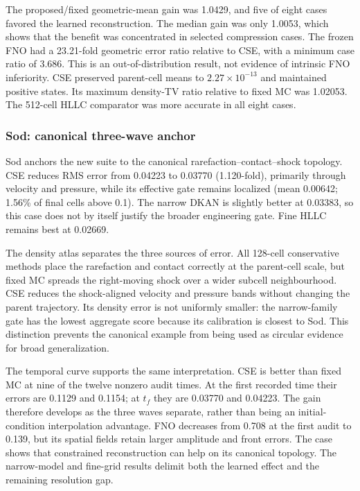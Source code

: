 \documentclass[10pt,twocolumn]{article}
\begin{document}
The proposed/fixed geometric-mean gain was 1.0429, and five of eight cases favored the learned reconstruction. The median gain was only 1.0053, which shows that the benefit was concentrated in selected compression cases. The frozen FNO had a 23.21-fold geometric error ratio relative to CSE, with a minimum case ratio of 3.686. This is an out-of-distribution result, not evidence of intrinsic FNO inferiority. CSE preserved parent-cell means to $2.27\times10^{-13}$ and maintained positive states. Its maximum density-TV ratio relative to fixed MC was 1.02053. The 512-cell HLLC comparator was more accurate in all eight cases.

\subsubsection{Sod: canonical three-wave anchor}

Sod anchors the new suite to the canonical rarefaction--contact--shock topology. CSE reduces RMS error from 0.04223 to 0.03770 (1.120-fold), primarily through velocity and pressure, while its effective gate remains localized (mean 0.00642; 1.56\% of final cells above 0.1). The narrow DKAN is slightly better at 0.03383, so this case does not by itself justify the broader engineering gate. Fine HLLC remains best at 0.02669.

The density atlas separates the three sources of error. All 128-cell conservative methods place the rarefaction and contact correctly at the parent-cell scale, but fixed MC spreads the right-moving shock over a wider subcell neighbourhood. CSE reduces the shock-aligned velocity and pressure bands without changing the parent trajectory. Its density error is not uniformly smaller: the narrow-family gate has the lowest aggregate score because its calibration is closest to Sod. This distinction prevents the canonical example from being used as circular evidence for broad generalization.

The temporal curve supports the same interpretation. CSE is better than fixed MC at nine of the twelve nonzero audit times. At the first recorded time their errors are 0.1129 and 0.1154; at $t_f$ they are 0.03770 and 0.04223. The gain therefore develops as the three waves separate, rather than being an initial-condition interpolation advantage. FNO decreases from 0.708 at the first audit to 0.139, but its spatial fields retain larger amplitude and front errors. The case shows that constrained reconstruction can help on its canonical topology. The narrow-model and fine-grid results delimit both the learned effect and the remaining resolution gap.
\end{document}
